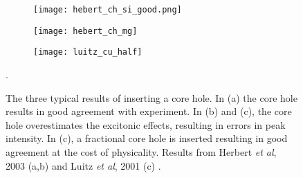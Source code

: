 \begin{figure}
	\begin{subfigure}{0.45\textwidth}
		\texttt{[image: hebert\_ch\_si\_good.png]} 
		\caption{}
		\label{hebert-ch-good}
	\end{subfigure}
    \hspace{-0.01cm}
	\begin{subfigure}{0.45\textwidth}
		\texttt{[image: hebert\_ch\_mg]} 
		\caption{}
		\label{hebert-ch-bad}
	\end{subfigure}
	\vspace{1cm}
	\begin{subfigure}{0.45\textwidth}
		\texttt{[image: luitz\_cu\_half]} 
		\caption{}
		\label{luitz_half}
	\end{subfigure}
	\centering
	\caption{The three typical results of inserting a core hole. In (a) the core hole results in good agreement with experiment.  In (b) and (c), the core hole overestimates the excitonic effects, resulting in errors in peak intensity.  In (c), a fractional core hole is inserted resulting in good agreement at the cost of physicality. Results from Herbert \textit{et al}, 2003  (a,b) and Luitz \textit{et al}, 2001 (c)\cite{luitz_partial_2001, hebert_improvement_2003} .}
	\label{core-hole-types}. 
	
\end{figure}

\newpage




